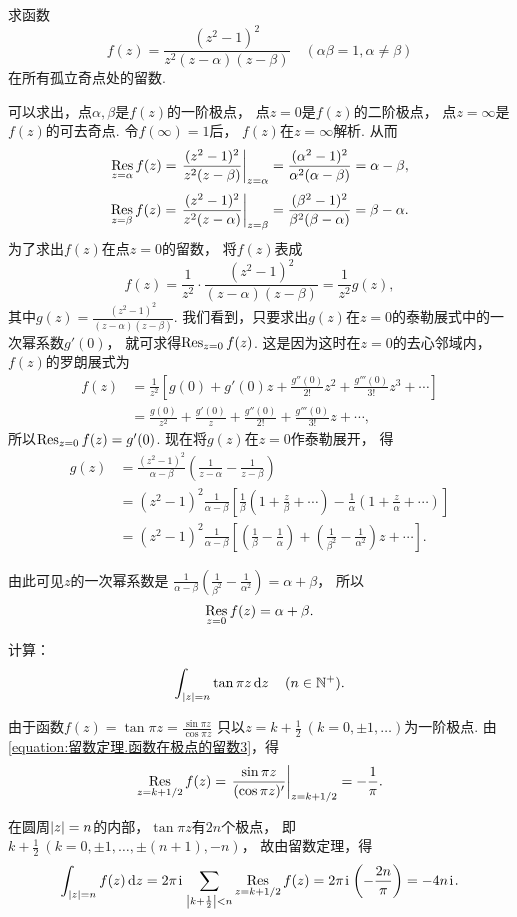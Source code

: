 \begin{example}
求函数\[
	f(z) = \frac{(z^2-1)^2}{z^2(z-\alpha)(z-\beta)}
	\quad(\alpha\beta=1, \alpha\neq\beta)
\]在所有孤立奇点处的留数.
\begin{solution}
可以求出，点\(\alpha,\beta\)是\(f(z)\)的一阶极点，
点\(z=0\)是\(f(z)\)的二阶极点，
点\(z=\infty\)是\(f(z)\)的可去奇点.
令\(f(\infty)=1\)后，
\(f(z)\)在\(z=\infty\)解析.
从而\[
	\Res_{z=\alpha} f(z)
	= \eval{ \frac{(z^2-1)^2}{z^2(z-\beta)} }_{z=\alpha}
	= \frac{(\alpha^2-1)^2}{\alpha^2(\alpha-\beta)}
	= \alpha-\beta,
\]\[
	\Res_{z=\beta} f(z)
	= \eval{ \frac{(z^2-1)^2}{z^2(z-\alpha)} }_{z=\beta}
	= \frac{(\beta^2-1)^2}{\beta^2(\beta-\alpha)}
	= \beta-\alpha.
\]
为了求出\(f(z)\)在点\(z=0\)的留数，
将\(f(z)\)表成\[
	f(z) = \frac{1}{z^2} \cdot \frac{(z^2-1)^2}{(z-\alpha)(z-\beta)}
	= \frac{1}{z^2} g(z),
\]
其中\(g(z) = \frac{(z^2-1)^2}{(z-\alpha)(z-\beta)}\).
我们看到，只要求出\(g(z)\)在\(z=0\)的泰勒展式中的一次幂系数\(g'(0)\)，
就可求得\(\operatorname*{Res}_{z=0} f(z)\).
这是因为这时在\(z=0\)的去心邻域内，
\(f(z)\)的罗朗展式为\begin{align*}
	f(z) &= \frac{1}{z^2}
		\left[
			g(0) + g'(0) z
			+ \frac{g''(0)}{2!} z^2
			+ \frac{g'''(0)}{3!} z^3
			+ \dotsb
		\right] \\
	&= \frac{g(0)}{z^2}
		+ \frac{g'(0)}{z}
		+ \frac{g''(0)}{2!}
		+ \frac{g'''(0)}{3!} z
		+ \dotsb,
\end{align*}
所以\(\operatorname*{Res}_{z=0} f(z) = g'(0)\).
现在将\(g(z)\)在\(z=0\)作泰勒展开，
得\begin{align*}
	g(z) &= \frac{(z^2-1)^2}{\alpha-\beta}
		\left(\frac{1}{z-\alpha}-\frac{1}{z-\beta}\right) \\
	&= (z^2-1)^2 \frac{1}{\alpha-\beta}
		\left[
			\frac{1}{\beta} \left(1+\frac{z}{\beta}+\dotsb\right)
			- \frac{1}{\alpha} \left(1+\frac{z}{\alpha}+\dotsb\right)
		\right] \\
	&= (z^2-1)^2 \frac{1}{\alpha-\beta}
		\left[
			\left(\frac{1}{\beta}-\frac{1}{\alpha}\right)
			+ \left(\frac{1}{\beta^2}-\frac{1}{\alpha^2}\right) z
			+ \dotsb
		\right].
\end{align*}

由此可见\(z\)的一次幂系数是
\(\frac{1}{\alpha-\beta} \left(\frac{1}{\beta^2}-\frac{1}{\alpha^2}\right)
= \alpha+\beta\)，
所以\[
	\operatorname*{Res}_{z=0} f(z) = \alpha+\beta.
\]
\end{solution}
\end{example}

\begin{example}
计算：\[
	\int_{\abs{z}=n} \tan \pi z \dd{z}
	\quad(n\in\mathbb{N}^+).
\]
\begin{solution}
由于函数\(f(z) = \tan \pi z = \frac{\sin \pi z}{\cos \pi z}\)
只以\(z=k+\frac{1}{2}\ (k=0,\pm1,\dotsc)\)为一阶极点.
由\cref{equation:留数定理.函数在极点的留数3}，得\[
	\Res_{z=k+1/2} f(z)
	= \eval{\frac{\sin \pi z}{(\cos \pi z)'}}_{z=k+1/2}
	= -\frac{1}{\pi}.
\]

在圆周\(\abs{z}=n\)的内部，\(\tan \pi z\)有\(2n\)个极点，
即\(k + \frac{1}{2}\ (k=0,\pm1,\dotsc,\pm(n+1),-n)\)，
故由留数定理，得\[
	\int_{\abs{z}=n} f(z) \dd{z}
	= 2\pi\kern1pt\mathrm{i}\kern1pt \sum_{\abs{k+\frac{1}{2}}<n} \operatorname*{Res}_{z=k+1/2} f(z)
	= 2\pi\kern1pt\mathrm{i}\kern1pt \left(-\frac{2n}{\pi}\right)
	= -4n\kern1pt\mathrm{i}\kern1pt.
\]
\end{solution}
\end{example}
